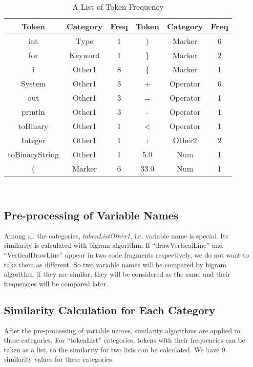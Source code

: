 \documentclass[../main.tex]{subfiles}
\begin{document}
\begin{table}[t]
\footnotesize
\setlength{\abovecaptionskip}{0pt}
\setlength{\belowcaptionskip}{0pt}
\caption{A List of Token Frequency}\label{tab:Table_1}
\begin{tabular}{|c|c|c||c|c|c|}
\hline
\textbf{Token} & \textbf{Category} & \textbf{Freq} & \textbf{Token} & \textbf{Category} & \textbf{Freq}\\
\hline
int & Type &1 		&  ) & Marker & 6\\
\hline
for & Keyword & 1 	& \} & Marker & 2\\
\hline
i & Other1 & 8		& \{ & Marker & 1\\
\hline
System & Other1 & 3	& + & Operator & 6\\
\hline
out & Other1 & 3	& = & Operator & 1\\
\hline
println & Other1 & 3	& - & Operator & 1\\
\hline
toBinary & Other1 & 1	& < & Operator & 1\\
\hline
Integer & Other1 & 1	& : & Other2 & 2\\
\hline
toBinaryString & Other1 & 1	& 5.0 & Num & 1\\
\hline
( & Marker & 6		& 33.0 & Num & 1\\
\hline
\end{tabular} \\
\end{table}

\subsection{Pre-processing of Variable Names}

Among all the categories, \textit{ tokenListOther1}, i.e. variable name is special. Its similarity is calculated with bigram algorithm\cite{bigram}. If ``drawVerticalLine'' and ``VerticalDrawLine'' appear in two code fragments respectively, we do not want to take them as different. So two variable names will be compared by bigram algorithm, if they are similar, they will be considered as the same and their frequencies will be compared later.

\subsection{Similarity Calculation for Each Category}

After the pre-processing of variable names, similarity algorithms are applied to these categories. For ``tokenList'' categories, tokens with their frequencies can be taken as a list, so the similarity for two lists can be calculated. We have 9 similarity values for these categories.
\end{document}
